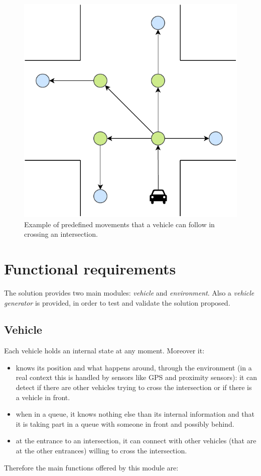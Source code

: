 \documentclass{memoir}
\begin{document}
\begin{figure}
	\centering
	\includegraphics[width=0.4\linewidth]{intersection_graph.pdf}
	\caption{Example of predefined movements that a vehicle can follow in crossing an intersection.}
	\label{fig:intersection-graph}
\end{figure}

\section{Functional requirements}
The solution provides two main modules: \emph{vehicle} and \emph{environment}. Also a \emph{vehicle generator} is provided, in order to test and validate the solution proposed.

\subsection{Vehicle}
Each vehicle holds an internal state at any moment. Moreover it:

\begin{itemize}
	\item knows its position and what happens around, through the environment (in a real context this is handled by sensors like GPS and proximity sensors): it can detect if there are other vehicles trying to cross the intersection or if there is a vehicle in front.
	\item when in a queue, it knows nothing else than its internal information and that it is taking part in a queue with someone in front and possibly behind.
	\item at the entrance to an intersection, it can connect with other vehicles (that are at the other entrances) willing to cross the intersection.
\end{itemize}
Therefore the main functions offered by this module are:
\end{document}
